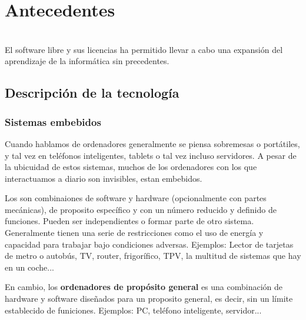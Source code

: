 \chapter{Antecedentes}

\noindent{}\\

El software libre y sus licencias \cite{gplv3} ha permitido llevar a cabo una expansión del aprendizaje de la informática sin precedentes.

\section{Descripción de la tecnología}
\subsection{Sistemas embebidos}
Cuando hablamos de ordenadores generalmente se piensa sobremesas o portátiles, y tal vez en teléfonos inteligentes, tablets o tal vez incluso servidores. A pesar de la ubicuidad de estos sistemas, muchos de los ordenadores con los que interactuamos a diario son invisibles, estan embebidos.

Los  son combinaiones de software y hardware (opcionalmente con partes mecánicas), de proposito específico y con un número reducido y definido de funciones. Pueden ser independientes o formar parte de otro sistema. Generalmente tienen una serie de restricciones como el uso de energía y capacidad para trabajar bajo condiciones adversas. Ejemplos: Lector de tarjetas de metro o autobús, TV, router, frigorífico, TPV, la multitud de sistemas que hay en un coche... \cite{es_glossary} \cite{marwedel}

En cambio, los \textbf{ordenadores de propósito general} es una combinación de hardware y software diseñados para un proposito general, es decir, sin un límite establecido de funiciones. Ejemplos: PC, teléfono inteligente, servidor... \cite{es_glossary}

